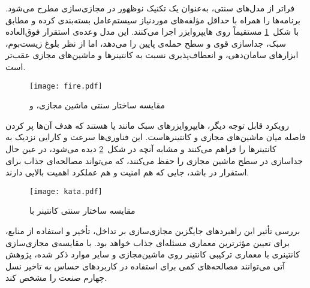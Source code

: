 فراتر از مدل‌های سنتی،  به‌عنوان یک تکنیک نوظهور در مجازی‌سازی مطرح می‌شود.  برنامه‌ها را همراه با حداقل مؤلفه‌های موردنیاز سیستم‌عامل بسته‌بندی کرده و مطابق با شکل~\ref{figure:fireVuni} مستقیماً روی هایپروایزر اجرا می‌کنند\cite{firecracker2018}. این مدل وعده‌ی استقرار فوق‌العاده سبک، جداسازی قوی و سطح حمله‌ی پایین را می‌دهد، اما از نظر بلوغ زیست‌بوم، ابزارهای سامان‌دهی، و انعطاف‌پذیری نسبت به کانتینرها و ماشین‌های مجازی عقب‌تر است.

\vspace{0.5cm}
\begin{figure}[h]
\centering
\texttt{[image: fire.pdf]}
\caption{مقایسه ساختار سنتی ماشین مجازی،  و \cite{firecracker2018}}
\label{figure:fireVuni}
\end{figure}
\vspace{0.5cm}

رویکرد قابل توجه دیگر، هایپروایزرهای سبک مانند  یا  هستند که هدف آن‌ها پر کردن فاصله میان ماشین‌های مجازی و کانتینرهاست. این فناوری‌ها سرعت و کارایی نزدیک به کانتینرها را فراهم می‌کنند و مشابه آنچه در شکل~\ref{figure:containerVkata} دیده می‌شود، در عین حال جداسازی در سطح ماشین مجازی را حفظ می‌کنند\cite{kata2019}، که می‌تواند مصالحه‌ای جذاب برای استقرار در  باشد، جایی که هم امنیت و هم عملکرد اهمیت بالایی دارند.

\vspace{0.5cm}
\begin{figure}[h]
\centering
\texttt{[image: kata.pdf]}
\caption{مقایسه ساختار سنتی کانتینر با \cite{kata2019}}
\label{figure:containerVkata}
\end{figure}
\vspace{0.5cm}

بررسی تأثیر این راهبردهای جایگزین مجازی‌سازی بر تداخل، تأخیر و استفاده از منابع، برای تعیین مؤثرترین معماری مسئله‌ای جذاب خواهد بود. با مقایسه‌ی مجازی‌سازی کانتینری با معماری ترکیبی کانتینر روی ماشین‌مجازی و سایر موارد ذکر شده، پژوهش‌ آتی می‌توانند مصالحه‌های کمی برای استفاده در کاربردهای حساس به تاخیر نسل چهارم صنعت را مشخص کند.